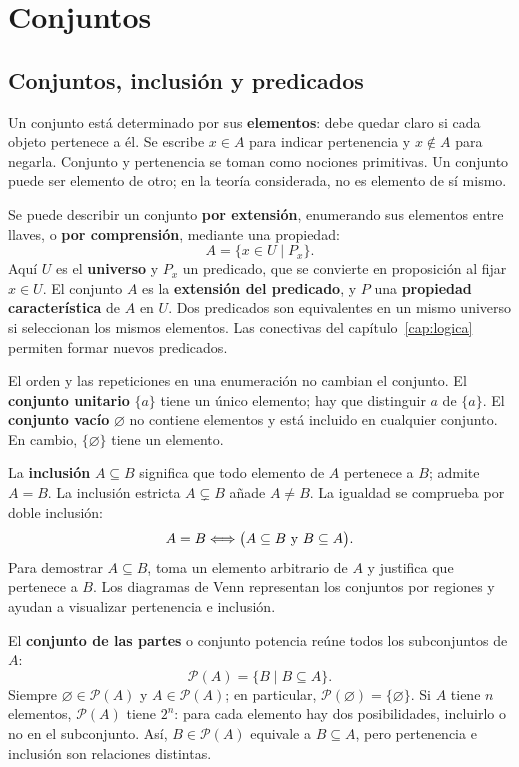 \chapter{Conjuntos}
\label{cap:conjuntos}

\section{Conjuntos, inclusión y predicados}
\label{sec:conjuntos-predicados}

Un conjunto está determinado por sus \textbf{elementos}: debe quedar
claro si cada objeto pertenece a él. Se escribe $x\in A$ para indicar
pertenencia y $x\notin A$ para negarla. Conjunto y pertenencia se toman
como nociones primitivas. Un conjunto puede ser elemento de otro;
en la teoría considerada, no es elemento de sí mismo.

Se puede describir un conjunto \textbf{por extensión}, enumerando sus
elementos entre llaves, o \textbf{por comprensión}, mediante una propiedad:
\[
 A=\{x\in U\mid P_x\}.
\]
Aquí $U$ es el \textbf{universo} y $P_x$ un predicado, que se convierte
en proposición al fijar $x\in U$. El conjunto $A$ es la
\textbf{extensión del predicado}, y $P$ una \textbf{propiedad característica}
de $A$ en $U$. Dos predicados son equivalentes en un mismo universo si
seleccionan los mismos elementos. Las conectivas del
capítulo~\ref{cap:logica} permiten formar nuevos predicados.

El orden y las repeticiones en una enumeración no cambian el conjunto.
El \textbf{conjunto unitario} $\{a\}$ tiene un único elemento; hay que
distinguir $a$ de $\{a\}$. El \textbf{conjunto vacío} $\varnothing$ no
contiene elementos y está incluido en cualquier conjunto.
En cambio, $\{\varnothing\}$ tiene un elemento.

La \textbf{inclusión} $A\subseteq B$ significa que todo elemento de $A$
pertenece a $B$; admite $A=B$. La inclusión estricta $A\subsetneq B$
añade $A\ne B$. La igualdad se comprueba por doble inclusión:
\[
 A=B\Longleftrightarrow\bigl(A\subseteq B\ \text{y}\ B\subseteq A\bigr).
\]
Para demostrar $A\subseteq B$, toma un elemento arbitrario de $A$ y
justifica que pertenece a $B$. Los diagramas de Venn representan los
conjuntos por regiones y ayudan a visualizar pertenencia e inclusión.

El \textbf{conjunto de las partes} o conjunto potencia reúne todos los
subconjuntos de $A$:
\[
 \mathcal P(A)=\{B\mid B\subseteq A\}.
\]
Siempre $\varnothing\in\mathcal P(A)$ y $A\in\mathcal P(A)$;
en particular, $\mathcal P(\varnothing)=\{\varnothing\}$.
Si $A$ tiene $n$ elementos, $\mathcal P(A)$ tiene $2^n$: para cada
elemento hay dos posibilidades, incluirlo o no en el subconjunto.
Así, $B\in\mathcal P(A)$ equivale a $B\subseteq A$, pero
pertenencia e inclusión son relaciones distintas.

